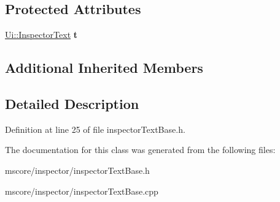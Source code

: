 \subsection*{Protected Attributes}
\begin{DoxyCompactItemize}
\item 
\mbox{\label{class_ms_1_1_inspector_text_base_a958aa78406167c30dd08e4ac7a14baa6}} 
\hyperlink{class_ui_1_1_inspector_text}{Ui\+::\+Inspector\+Text} {\bfseries t}
\end{DoxyCompactItemize}
\subsection*{Additional Inherited Members}


\subsection{Detailed Description}


Definition at line 25 of file inspector\+Text\+Base.\+h.



The documentation for this class was generated from the following files\+:\begin{DoxyCompactItemize}
\item 
mscore/inspector/inspector\+Text\+Base.\+h\item 
mscore/inspector/inspector\+Text\+Base.\+cpp\end{DoxyCompactItemize}
